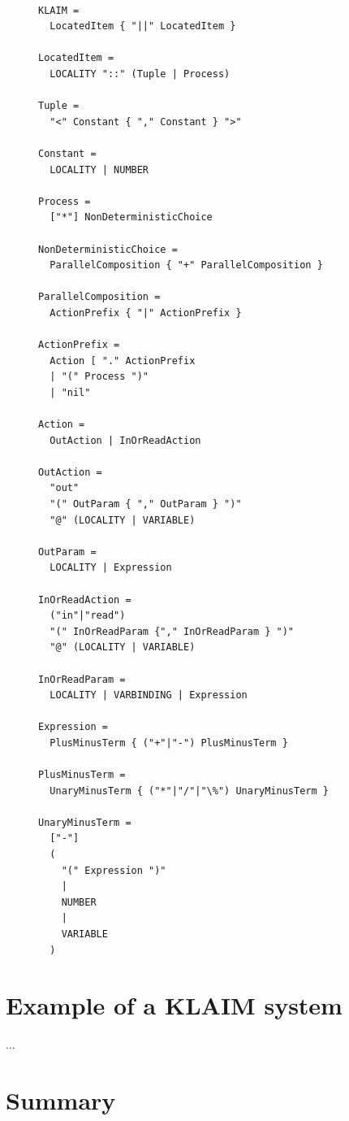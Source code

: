 	\begin{figure}
\lstset{showtabs=false,showspaces=false,showstringspaces=false}
\begin{lstlisting}[caption=EBNF Productions of KLAIM,frame=trbl,label=lst:klaim_ebnf,basicstyle=\scriptsize\ttfamily,showtabs=false,showspaces=false]

KLAIM = 
  LocatedItem { "||" LocatedItem }                

LocatedItem = 
  LOCALITY "::" (Tuple | Process)

Tuple = 
  "<" Constant { "," Constant } ">"

Constant = 
  LOCALITY | NUMBER

Process = 
  ["*"] NonDeterministicChoice

NonDeterministicChoice =  
  ParallelComposition { "+" ParallelComposition }

ParallelComposition = 
  ActionPrefix { "|" ActionPrefix }

ActionPrefix = 
  Action [ "." ActionPrefix
  | "(" Process ")"  
  | "nil"

Action = 
  OutAction | InOrReadAction

OutAction = 
  "out" 
  "(" OutParam { "," OutParam } ")" 
  "@" (LOCALITY | VARIABLE)

OutParam = 
  LOCALITY | Expression

InOrReadAction = 
  ("in"|"read") 
  "(" InOrReadParam {"," InOrReadParam } ")" 
  "@" (LOCALITY | VARIABLE)

InOrReadParam = 
  LOCALITY | VARBINDING | Expression

Expression = 
  PlusMinusTerm { ("+"|"-") PlusMinusTerm }

PlusMinusTerm = 
  UnaryMinusTerm { ("*"|"/"|"\%") UnaryMinusTerm }

UnaryMinusTerm = 
  ["-"] 
  ( 
    "(" Expression ")" 
    | 
    NUMBER 
    | 
    VARIABLE 
  )

	\end{lstlisting}
	\end{figure}


\section{Example of a  KLAIM system}
  ...	

\section{Summary}

